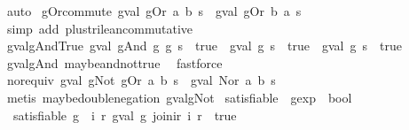 \begin{isabellebody}
\ auto%
\endisatagproof
{\isafoldproof}%
%
\isadelimproof
\isanewline
%
\endisadelimproof
\isanewline
{}\isamarkupfalse%
\ gOr{\isacharunderscore}commute{\isacharcolon}\ {\isachardoublequoteopen}gval\ {\isacharparenleft}gOr\ a\ b{\isacharparenright}\ s\ {\isacharequal}\ gval\ {\isacharparenleft}gOr\ b\ a{\isacharparenright}\ s{\isachardoublequoteclose}\isanewline
%
\isadelimproof
\ \ %
\endisadelimproof
%
\isatagproof
{}\isamarkupfalse%
\ {\isacharparenleft}simp\ add{\isacharcolon}\ plus{\isacharunderscore}trilean{\isacharunderscore}commutative{\isacharparenright}%
\endisatagproof
{\isafoldproof}%
%
\isadelimproof
\isanewline
%
\endisadelimproof
\isanewline
{}\isamarkupfalse%
\ gval{\isacharunderscore}gAnd{\isacharunderscore}True{\isacharcolon}\ {\isachardoublequoteopen}{\isacharparenleft}gval\ {\isacharparenleft}gAnd\ g{}\ g{}{\isacharparenright}\ s\ {\isacharequal}\ true{\isacharparenright}\ {\isacharequal}\ {\isacharparenleft}{\isacharparenleft}gval\ g{}\ s\ {\isacharequal}\ true{\isacharparenright}\ {\isasymand}\ gval\ g{}\ s\ {\isacharequal}\ true{\isacharparenright}{\isachardoublequoteclose}\isanewline
%
\isadelimproof
\ \ %
\endisadelimproof
%
\isatagproof
{}\isamarkupfalse%
\ gval{\isacharunderscore}gAnd\ maybe{\isacharunderscore}and{\isacharunderscore}not{\isacharunderscore}true\ \isamarkupfalse%
\ fastforce%
\endisatagproof
{\isafoldproof}%
%
\isadelimproof
\isanewline
%
\endisadelimproof
\isanewline
{}\isamarkupfalse%
\ nor{\isacharunderscore}equiv{\isacharcolon}\ {\isachardoublequoteopen}gval\ {\isacharparenleft}gNot\ {\isacharparenleft}gOr\ a\ b{\isacharparenright}{\isacharparenright}\ s\ {\isacharequal}\ gval\ {\isacharparenleft}Nor\ a\ b{\isacharparenright}\ s{\isachardoublequoteclose}\isanewline
%
\isadelimproof
\ \ %
\endisadelimproof
%
\isatagproof
{}\isamarkupfalse%
\ {\isacharparenleft}metis\ maybe{\isacharunderscore}double{\isacharunderscore}negation\ gval{\isacharunderscore}gNot{\isacharparenright}%
\endisatagproof
{\isafoldproof}%
%
\isadelimproof
\isanewline
%
\endisadelimproof
\isanewline
{}\isamarkupfalse%
\ satisfiable\ {\isacharcolon}{\isacharcolon}\ {\isachardoublequoteopen}gexp\ {\isasymRightarrow}\ bool{\isachardoublequoteclose}\ \isanewline
\ \ {\isachardoublequoteopen}satisfiable\ g\ {\isasymequiv}\ {\isacharparenleft}{\isasymexists}i\ r{\isachardot}\ gval\ g\ {\isacharparenleft}join{\isacharunderscore}ir\ i\ r{\isacharparenright}\ {\isacharequal}\ true{\isacharparenright}{\isachardoublequoteclose}\isanewline

\end{isabellebody}
